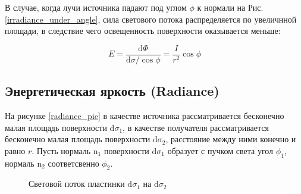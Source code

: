 \documentclass[12pt]{article}
\def\d{ \mathrm{d} }
\def\norm{ \mathrm{n} }
\begin{document}
В случае, когда лучи источника падают под углом $\phi$ к нормали на Рис. \eqref{irradiance_under_angle}, сила светового
потока распределяется по увеличнной площади, в следствие чего освещенность поверхности
оказывается меньше:

\begin{equation}
  E=\frac{\d\Phi}{\d\sigma/\cos\phi}=\frac{I}{r^2}\cos\phi
\end{equation}

\subsection{Энергетическая яркость (Radiance)}

На рисунке \eqref{radiance_pic} в качестве источника рассматривается бесконечно
малая площадь поверхности $\d\sigma_1$, в качестве получателя рассматривается бесконечно
малая площадь поверхности $\d\sigma_2$, расстояние между ними конечно и равно $r$.
Пусть нормаль $\norm_1$ поверхности $\d\sigma_1$ образует с пучком света угол $\phi_1$,
нормаль $\norm_2$ соответсвенно $\phi_2$.

\begin{figure}[h]
  \begin{center}
    \caption{Световой поток пластинки $\d\sigma_1$ на $\d\sigma_2$}
    \label{radiance_pic}
  \end{center}
\end{figure}
\end{document}
